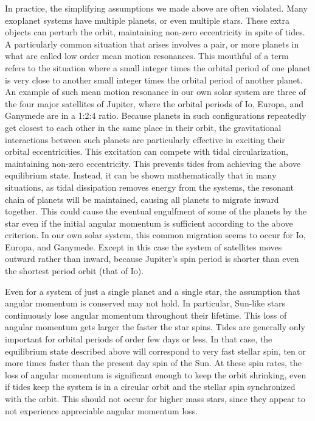 In practice, the simplifying assumptions we made above are often violated. Many
exoplanet systems have multiple planets, or even multiple stars. These extra
objects can perturb the orbit, maintaining non-zero eccentricity in spite of
tides. A particularly common situation that arises involves a pair, or more
planets in what are called low order mean motion resonances. This mouthful of a
term refers to the situation where a small integer times the orbital period of
one planet is very close to another small integer times the orbital period of
another planet. An example of such mean motion resonance in our own solar system
are three of the four major satellites of Jupiter, where the orbital periods of
Io, Europa, and Ganymede are in a 1:2:4 ratio. Because planets in such
configurations repeatedly get closest to each other in the same place in their
orbit, the gravitational interactions between such planets are particularly
effective in exciting their orbital eccentricities. This excitation can compete
with tidal circularization, maintaining non-zero eccentricity. This prevents
tides from achieving the above equilibrium state. Instead, it can be shown
mathematically that in many situations, as tidal dissipation removes energy from
the systems, the resonant chain of planets will be maintained, causing all
planets to migrate inward together. This could cause the eventual engulfment of
some of the planets by the star even if the initial angular momentum is
sufficient according to the above criterion. In our own solar system, this
common migration seems to occur for Io, Europa, and Ganymede. Except in this
case the system of satellites moves outward rather than inward, because
Jupiter's spin period is shorter than even the shortest period orbit (that of
Io).

Even for a system of just a single planet and a single star, the assumption that
angular momentum is conserved may not hold. In particular, Sun-like stars
continuously lose angular momentum throughout their lifetime. This loss of
angular momentum gets larger the faster the star spins. Tides are generally only
important for orbital periods of order few days or less. In that case, the
equilibrium state described above will correspond to very fast stellar spin, ten
or more times faster than the present day spin of the Sun. At these spin rates,
the loss of angular momentum is significant enough to keep the orbit shrinking,
even if tides keep the system is in a circular orbit and the stellar spin
synchronized with the orbit. This should not occur for higher mass stars, since
they appear to not experience appreciable angular momentum loss.
